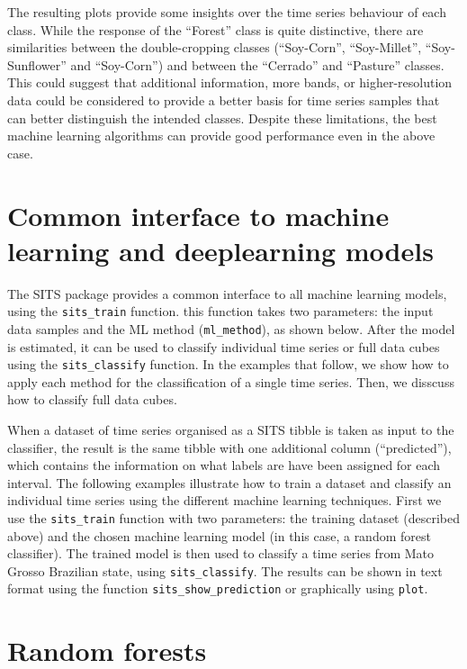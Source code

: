 \documentclass[a4paper,]{tufte-book}
\begin{document}
The resulting plots provide some insights over the time series behaviour of each class. While the response of the ``Forest'' class is quite distinctive, there are similarities between the double-cropping classes (``Soy-Corn'', ``Soy-Millet'', ``Soy-Sunflower'' and ``Soy-Corn'') and between the ``Cerrado'' and ``Pasture'' classes. This could suggest that additional information, more bands, or higher-resolution data could be considered to provide a better basis for time series samples that can better distinguish the intended classes. Despite these limitations, the best machine learning algorithms can provide good performance even in the above case.

\hypertarget{common-interface-to-machine-learning-and-deeplearning-models}{%
\section{Common interface to machine learning and deeplearning models}\label{common-interface-to-machine-learning-and-deeplearning-models}}

The SITS package provides a common interface to all machine learning models, using the \texttt{sits\_train} function. this function takes two parameters: the input data samples and the ML method (\texttt{ml\_method}), as shown below. After the model is estimated, it can be used to classify individual time series or full data cubes using the \texttt{sits\_classify} function. In the examples that follow, we show how to apply each method for the classification of a single time series. Then, we disscuss how to classify full data cubes.

When a dataset of time series organised as a SITS tibble is taken as input to the classifier, the result is the same tibble with one additional column (``predicted''), which contains the information on what labels are have been assigned for each interval. The following examples illustrate how to train a dataset and classify an individual time series using the different machine learning techniques. First we use the \texttt{sits\_train} function with two parameters: the training dataset (described above) and the chosen machine learning model (in this case, a random forest classifier). The trained model is then used to classify a time series from Mato Grosso Brazilian state, using \texttt{sits\_classify}. The results can be shown in text format using the function \texttt{sits\_show\_prediction} or graphically using \texttt{plot}.

\hypertarget{random-forests}{%
\section{Random forests}\label{random-forests}}
\end{document}

